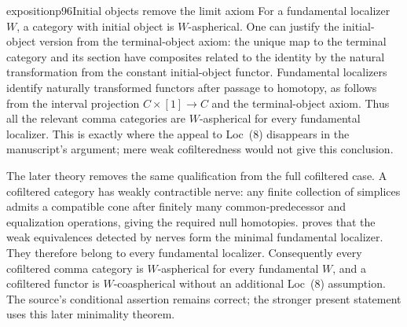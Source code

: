 \begin{dcomment}{exposition}{p96}{Initial objects remove the limit axiom}
For a fundamental localizer $W$, a category with initial object is $W$-aspherical. One can justify the initial-object version from the terminal-object axiom: the unique map to the terminal category and its section have composites related to the identity by the natural transformation from the constant initial-object functor. Fundamental localizers identify naturally transformed functors after passage to homotopy, as follows from the interval projection $C\times[1]\to C$ and the terminal-object axiom. Thus all the relevant comma categories are $W$-aspherical for every fundamental localizer. This is exactly where the appeal to Loc~(8) disappears in the manuscript's argument; mere weak cofilteredness would not give this conclusion.

The later theory removes the same qualification from the full cofiltered case. A cofiltered category has weakly contractible nerve: any finite collection of simplices admits a compatible cone after finitely many common-predecessor and equalization operations, giving the required null homotopies. \citet[Theorem 2.2.11, p.~136]{Cisinski2004Minimal} proves that the weak equivalences detected by nerves form the minimal fundamental localizer. They therefore belong to every fundamental localizer. Consequently every cofiltered comma category is $W$-aspherical for every fundamental $W$, and a cofiltered functor is $W$-coaspherical without an additional Loc~(8) assumption. The source's conditional assertion remains correct; the stronger present statement uses this later minimality theorem.
\end{dcomment}


